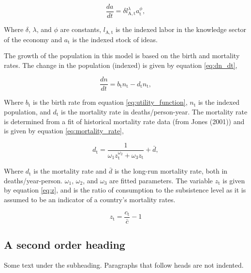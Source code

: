 \documentclass[letterpaper,12pt]{article}
\begin{document}
\begin{equation} \label{eq:da_dt}
\frac{da}{dt} = \delta l_\mathrm{A,t}^\lambda a_\mathrm{t}^\phi,
\end{equation}

Where $\delta$, $\lambda$, and $\phi$ are constants, $l_\mathrm{A,t}$ is the indexed labor in the knowledge sector of the economy and $a_\mathrm{t}$ is the indexed stock of ideas.

The growth of the population in this model is based on the birth and mortality rates. The change in the population (indexed) is given by equation \ref{eq:dn_dt},

\begin{equation} \label{eq:dn_dt}
\frac{dn}{dt} = b_\mathrm{t} n_\mathrm{t} - d_\mathrm{t} n_\mathrm{t},
\end{equation}

Where $b_\mathrm{t}$ is the birth rate from equation \ref{eq:utility_function}, $n_\mathrm{t}$ is the indexed population, and $d_\mathrm{t}$ is the mortality rate in deaths/person-year. The mortality rate is determined from a fit of historical mortality rate data (from Jones (2001)) and is given by equation \ref{eq:mortality_rate},

\begin{equation} \label{eq:mortality_rate}
d_\mathrm{t} = \frac{1}{\omega_\mathrm{1} z_\mathrm{t}^{\omega_\mathrm{2}} + \omega_\mathrm{3} z_\mathrm{t}} + \bar d,
\end{equation}

Where $d_\mathrm{t}$ is the mortality rate and $\bar d$ is the long-run mortality rate, both in deaths/year-person. $\omega_\mathrm{1}$, $\omega_\mathrm{2}$, and $\omega_\mathrm{3}$ are fitted parameters. The variable $z_\mathrm{t}$ is given by equation \ref{eq:z}, and is the ratio of consumption to the subsistence level as it is assumed to be an indicator of a country's mortality rates.

\begin{equation} \label{eq:z}
z_\mathrm{t} = \frac{c_\mathrm{t}}{\bar c} - 1
\end{equation}



\subsection{A second order heading}

Some text under the subheading. Paragraphs that follow heads are not
indented.
\end{document}
